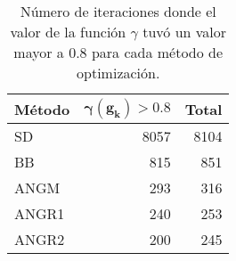 \begin{table}[H]
    \centering
    \begin{tabular}{lrr}
        \hline
        \textbf{Método} & $\boldsymbol{\gamma(g_k)>0.8}$ & \textbf{Total} \\\hline
        SD              & 8057                           & 8104           \\
        BB              & 815                            & 851            \\
        ANGM            & 293                            & 316            \\
        ANGR1           & 240                            & 253            \\
        ANGR2           & 200                            & 245            \\ \hline
    \end{tabular}
    \caption{Número de iteraciones donde el valor de la función $\gamma$ tuvó un valor mayor a 0.8 para cada método de optimización.}
    \label{table:gamma_function}
\end{table}